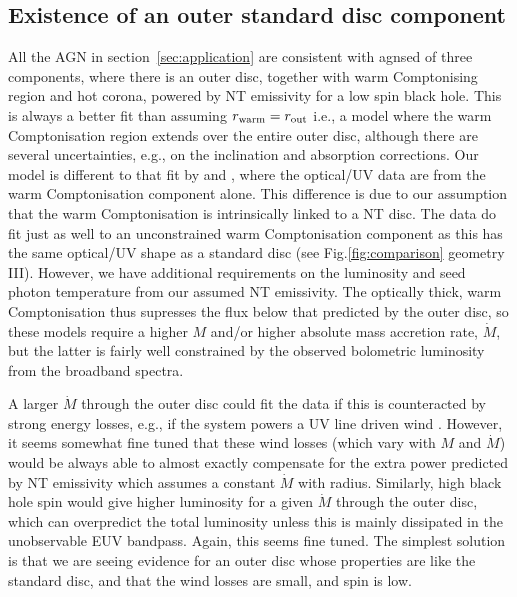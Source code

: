 \documentclass[a4paper,fleqn,usenatbib]{mnras}
\begin{document}
\subsection{Existence of an outer standard disc component}
\label{sec:outerdisk}

All the AGN in section~\ref{sec:application} are consistent with {\sc
  agnsed} of three components, where there is an outer disc, together
with warm Comptonising region and hot corona, powered by NT emissivity
for a low spin black hole. This is always a better fit than assuming
$r_{\rm warm}=r_{\rm out}$ i.e., a model where the warm Comptonisation
region extends over the entire outer disc,
although there are several uncertainties, e.g., on the inclination and 
absorption corrections.
Our model is different to that fit by \cite{5548} and \cite{petrucci2017}, where the optical/UV data are from the warm Comptonisation component alone.
This
difference is due to our assumption that the warm Comptonisation is
intrinsically linked to a NT disc. The data do fit just as well to an
unconstrained warm Comptonisation component as this has the same
optical/UV shape as a standard disc (see Fig.\ref{fig:comparison}
geometry III).
However, we have additional requirements on the luminosity and seed photon
temperature from our assumed NT emissivity.  The optically thick, warm
Comptonisation thus supresses the flux below that
predicted by the outer disc, so these models require a higher $M$ 
and/or higher absolute mass accretion rate, $\dot{M}$, but
the latter is fairly well constrained by the observed bolometric
luminosity from the broadband spectra. 

A larger $\dot{M}$
through the outer disc could fit the data if this is counteracted by
strong energy losses, e.g., if the system powers a UV line driven wind 
\citep{laor2014}. However, it seems
somewhat fine tuned that these wind losses (which vary with $M$ and
$\dot{M}$) would be always able 
to almost exactly compensate for the extra power 
predicted by
NT emissivity which assumes a constant $\dot{M}$ with radius. 
Similarly, high black hole spin would give higher
luminosity for a given $\dot{M}$ through the outer disc,
which can overpredict the total luminosity unless
this is mainly dissipated in the unobservable EUV bandpass. Again,
this seems fine tuned. The simplest solution is that we are seeing
evidence for an outer disc whose properties are like the standard
disc, and that the wind losses are small, and spin is low.
\end{document}
